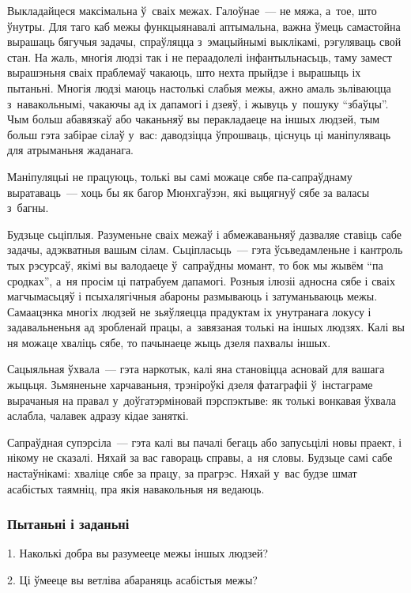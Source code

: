 Выкладайцеся максімальна ў~сваіх межах. Галоўнае~--- не мяжа, а~тое, што ўнутры. Для таго каб межы функцыянавалі аптымальна, важна ўмець самастойна вырашаць бягучыя задачы, спраўляцца з~эмацыйнымі выклікамі, рэгуляваць свой стан. На жаль, многія людзі так і не пераадолелі інфантыльнасьць, таму замест вырашэньня сваіх праблемаў чакаюць, што нехта прыйдзе і вырашыць іх пытаньні. Многія людзі маюць настолькі слабыя межы, ажно амаль зьліваюцца з~навакольнымі, чакаючы ад іх дапамогі і дзеяў, і жывуць у~пошуку ``збаўцы''. Чым больш абавязкаў або чаканьняў вы перакладаеце на іншых людзей, тым больш гэта забірае сілаў у~вас: даводзіцца ўпрошваць, ціснуць ці маніпуляваць для атрыманьня жаданага.

Маніпуляцыі не працуюць, толькі вы самі можаце сябе па-сапраўднаму выратаваць~--- хоць бы як багор Мюнхгаўзэн, які выцягнуў сябе за валасы з~багны.

Будзьце сьціплыя. Разуменьне сваіх межаў і абмежаваньняў дазваляе ставіць сабе задачы, адэкватныя вашым сілам. Сьціпласьць~--- гэта ўсьведамленьне і кантроль тых рэсурсаў, якімі вы валодаеце ў~сапраўдны момант, то бок мы жывём ``па сродках'', а~ня просім ці патрабуем дапамогі. Розныя ілюзіі адносна сябе і сваіх магчымасьцяў і псыхалягічныя абароны размываюць і затуманьваюць межы. Самаацэнка многіх людзей не зьяўляецца прадуктам іх унутранага локусу і задавальненьня ад зробленай працы, а~завязаная толькі на іншых людзях. Калі вы ня можаце хваліць сябе, то пачынаеце жыць дзеля пахвалы іншых. 

Сацыяльная ўхвала~--- гэта наркотык, калі яна становіцца асновай для вашага жыцьця. Зьмяненьне харчаваньня, трэніроўкі дзеля фатаграфіі ў~інстаграме вырачаныя на правал у~доўгатэрміновай пэрспэктыве: як толькі вонкавая ўхвала аслабла, чалавек адразу кідае заняткі. 

Сапраўдная супэрсіла~--- гэта калі вы пачалі бегаць або запусьцілі новы праект, і нікому не сказалі. Няхай за вас гавораць справы, а~ня словы. Будзьце самі сабе настаўнікамі: хваліце сябе за працу, за прагрэс. Няхай у~вас будзе шмат асабістых таямніц, пра якія навакольныя ня ведаюць. 

\subsubsection{Пытаньні і заданьні}

1. Наколькі добра вы разумееце межы іншых людзей?

2. Ці ўмееце вы ветліва абараняць асабістыя межы?

